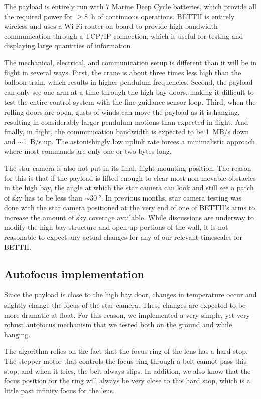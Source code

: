 The payload is entirely run with 7 Marine Deep Cycle batteries, which provide all the required power for $\ge$\SI{8}{\hour} of continuous operations. BETTII is entirely wireless and uses a Wi-Fi router on board to provide high-bandwidth communication through a TCP/IP connection, which is useful for testing and displaying large quantities of information.

The mechanical, electrical, and communication setup is different than it will be in flight in several ways. First, the crane is about three times less high than the balloon train, which results in higher pendulum frequencies. Second, the payload can only see one arm at a time through the high bay doors, making it difficult to test the entire control system with the fine guidance sensor loop. Third, when the rolling doors are open, gusts of winds can move the payload as it is hanging, resulting in considerably larger pendulum motions than expected in flight. And finally, in flight, the communication bandwidth is expected to be 1~MB/s down and $\sim$1~B/s up. The astonishingly low uplink rate forces a minimalistic approach where most commands are only one or two bytes long. 

The star camera is also not put in its final, flight mounting position. The reason for this is that if the payload is lifted enough to clear most non-movable obstacles in the high bay, the angle at which the star camera can look and still see a patch of sky has to be less than $\sim \SI{30}{\degree}$. In previous months, star camera testing was done with the star camera positioned at the very end of one of BETTII's arms to increase the amount of sky coverage available. While discussions are underway to modify the high bay structure and open up portions of the wall, it is not reasonable to expect any actual changes for any of our relevant timescales for BETTII.


\subsection{Autofocus implementation}

Since the payload is close to the high bay door, changes in temperature occur and slightly change the focus of the star camera. These changes are expected to be more dramatic at float. For this reason, we implemented a very simple, yet very robust autofocus mechanism that we tested both on the ground and while hanging.

The algorithm relies on the fact that the focus ring of the lens has a hard stop. The stepper motor that controls the focus ring through a belt cannot pass this stop, and when it tries, the belt always slips. In addition, we also know that the focus position for the ring will always be very close to this hard stop, which is a little past infinity focus for the lens. 

